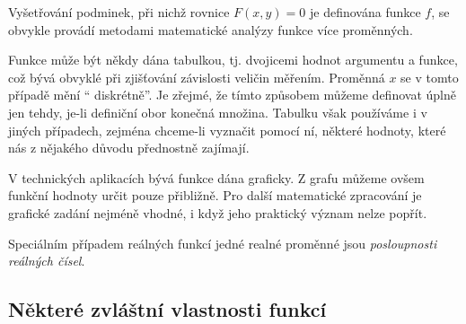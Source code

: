       Vyšetřování podminek, při nichž rovnice $F(x,y)=0$ je definována funkce $f$, se obvykle provádí 
      metodami matematické analýzy funkce více proměnných. 
      
      Funkce může být někdy dána tabulkou, tj. dvojicemi hodnot argumentu a funkce, což bývá obvyklé při 
      zjišťování závislosti veličin měřením. Proměnná $x$ se v tomto případě mění \textquotedblleft 
      diskrétně\textquotedblright. Je zřejmé, že tímto způsobem můžeme definovat úplně jen tehdy, je-li 
      definiční obor konečná množina. Tabulku však používáme i v jiných případech, zejména chceme-li vyznačit 
      pomocí ní, některé hodnoty, 
      které nás z nějakého důvodu přednostně zajímají. 
      
      V technických aplikacích bývá funkce dána graficky. Z grafu můžeme ovšem funkční hodnoty určit pouze 
      přibližně. Pro další matematické zpracování je grafické zadání nejméně vhodné, i když jeho praktický 
      význam nelze popřít. 
      
      Speciálním případem reálných funkcí jedné realné proměnné jsou \emph{posloupnosti reálných čísel}. 
         
    \subsection{Některé zvláštní vlastnosti funkcí}\label{MA1:subsec_vlastnosti_funkce}
